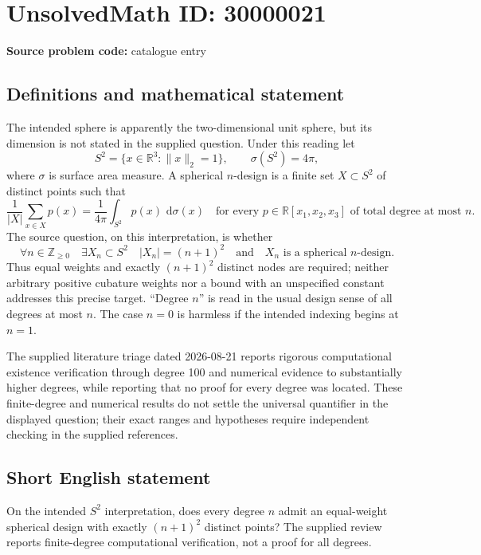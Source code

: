 \documentclass[11pt]{article}
\newcommand{\Z}{\mathbb{Z}}
\newcommand{\R}{\mathbb{R}}
\newcommand{\dd}{\,\mathrm{d}}
\begin{document}
\section*{UnsolvedMath ID: 30000021}
\textbf{Source problem code:} catalogue entry
\subsection{Definitions and mathematical statement}
The intended sphere is apparently the two-dimensional unit sphere, but its dimension is not stated in the supplied question. Under this reading let
\[
S^2=\{x\in\R^3:\|x\|_2=1\},\qquad \sigma(S^2)=4\pi,
\]
where \(\sigma\) is surface area measure. A spherical \(n\)-design is a finite set \(X\subset S^2\) of distinct points such that
\[
\frac{1}{|X|}\sum_{x\in X}p(x)=\frac{1}{4\pi}\int_{S^2}p(x)\,\dd\sigma(x)
\quad\text{for every }p\in\R[x_1,x_2,x_3]\text{ of total degree at most }n.
\]
The source question, on this interpretation, is whether
\[
\forall n\in\Z_{\geq0}\quad\exists X_n\subset S^2\quad
|X_n|=(n+1)^2\quad\text{and}\quad X_n\text{ is a spherical }n\text{-design}.
\]
Thus equal weights and exactly \((n+1)^2\) distinct nodes are required; neither arbitrary positive cubature weights nor a bound with an unspecified constant addresses this precise target. ``Degree \(n\)'' is read in the usual design sense of all degrees at most \(n\). The case \(n=0\) is harmless if the intended indexing begins at \(n=1\).

The supplied literature triage dated 2026-08-21 reports rigorous computational existence verification through degree 100 and numerical evidence to substantially higher degrees, while reporting that no proof for every degree was located. These finite-degree and numerical results do not settle the universal quantifier in the displayed question; their exact ranges and hypotheses require independent checking in the supplied references.
\subsection{Short English statement}
On the intended \(S^2\) interpretation, does every degree \(n\) admit an equal-weight spherical design with exactly \((n+1)^2\) distinct points? The supplied review reports finite-degree computational verification, not a proof for all degrees.
\end{document}
